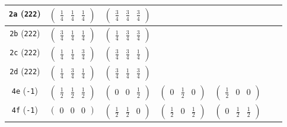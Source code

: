 \documentclass[fleqn,9pt,landscape]{jsarticle}
\begin{document}
\begin{center}
\begin{longtable}{ccccccc}
{\tt 2a} ({\tt 222}) & $ \begin{pmatrix} \frac{1}{4} & \frac{1}{4} & \frac{1}{4} \end{pmatrix} $ & $ \begin{pmatrix} \frac{3}{4} & \frac{3}{4} & \frac{3}{4} \end{pmatrix} $ & $  $ & $  $ & $  $ & $  $ \\ \hline
{\tt 2b} ({\tt 222}) & $ \begin{pmatrix} \frac{3}{4} & \frac{1}{4} & \frac{1}{4} \end{pmatrix} $ & $ \begin{pmatrix} \frac{1}{4} & \frac{3}{4} & \frac{3}{4} \end{pmatrix} $ & $  $ & $  $ & $  $ & $  $ \\ \hline
{\tt 2c} ({\tt 222}) & $ \begin{pmatrix} \frac{1}{4} & \frac{1}{4} & \frac{3}{4} \end{pmatrix} $ & $ \begin{pmatrix} \frac{3}{4} & \frac{3}{4} & \frac{1}{4} \end{pmatrix} $ & $  $ & $  $ & $  $ & $  $ \\ \hline
{\tt 2d} ({\tt 222}) & $ \begin{pmatrix} \frac{1}{4} & \frac{3}{4} & \frac{1}{4} \end{pmatrix} $ & $ \begin{pmatrix} \frac{3}{4} & \frac{1}{4} & \frac{3}{4} \end{pmatrix} $ & $  $ & $  $ & $  $ & $  $ \\ \hline
{\tt 4e} ({\tt -1}) & $ \begin{pmatrix} \frac{1}{2} & \frac{1}{2} & \frac{1}{2} \end{pmatrix} $ & $ \begin{pmatrix} 0 & 0 & \frac{1}{2} \end{pmatrix} $ & $ \begin{pmatrix} 0 & \frac{1}{2} & 0 \end{pmatrix} $ & $ \begin{pmatrix} \frac{1}{2} & 0 & 0 \end{pmatrix} $ & $  $ & $  $ \\ \hline
{\tt 4f} ({\tt -1}) & $ \begin{pmatrix} 0 & 0 & 0 \end{pmatrix} $ & $ \begin{pmatrix} \frac{1}{2} & \frac{1}{2} & 0 \end{pmatrix} $ & $ \begin{pmatrix} \frac{1}{2} & 0 & \frac{1}{2} \end{pmatrix} $ & $ \begin{pmatrix} 0 & \frac{1}{2} & \frac{1}{2} \end{pmatrix} $ & $  $ & $  $ \\ \hline

\end{longtable}
\end{center}
\end{document}
